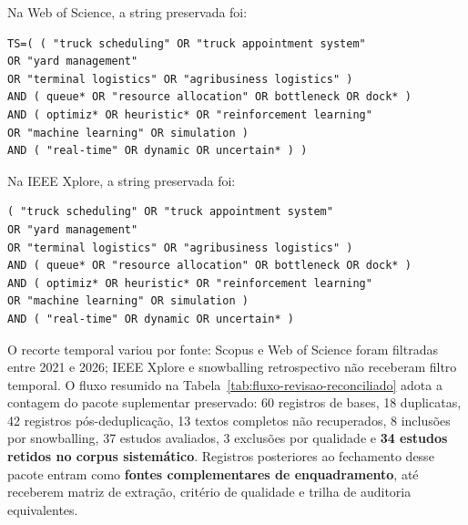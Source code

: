 \documentclass[
  12pt,
  oneside,
  a4paper,
  sumario=tradicional,
  brazil
]{abntex2}
\begin{document}
Na Web of Science, a string preservada foi:
{\scriptsize
\begin{verbatim}
TS=( ( "truck scheduling" OR "truck appointment system"
OR "yard management"
OR "terminal logistics" OR "agribusiness logistics" )
AND ( queue* OR "resource allocation" OR bottleneck OR dock* )
AND ( optimiz* OR heuristic* OR "reinforcement learning"
OR "machine learning" OR simulation )
AND ( "real-time" OR dynamic OR uncertain* ) )
\end{verbatim}
}

Na IEEE Xplore, a string preservada foi:
{\scriptsize
\begin{verbatim}
( "truck scheduling" OR "truck appointment system"
OR "yard management"
OR "terminal logistics" OR "agribusiness logistics" )
AND ( queue* OR "resource allocation" OR bottleneck OR dock* )
AND ( optimiz* OR heuristic* OR "reinforcement learning"
OR "machine learning" OR simulation )
AND ( "real-time" OR dynamic OR uncertain* )
\end{verbatim}
}

O recorte temporal variou por fonte: Scopus e Web of Science foram filtradas entre 2021 e 2026; IEEE Xplore e snowballing retrospectivo n\~ao receberam filtro temporal. O fluxo resumido na Tabela~\ref{tab:fluxo-revisao-reconciliado} adota a contagem do pacote suplementar preservado: 60 registros de bases, 18 duplicatas, 42 registros p\'os-deduplica\c{c}\~ao, 13 textos completos n\~ao recuperados, 8 inclus\~oes por snowballing, 37 estudos avaliados, 3 exclus\~oes por qualidade e \textbf{34 estudos retidos no corpus sistem\'atico}. Registros posteriores ao fechamento desse pacote entram como \textbf{fontes complementares de enquadramento}, at\'e receberem matriz de extra\c{c}\~ao, crit\'erio de qualidade e trilha de auditoria equivalentes.
\end{document}

